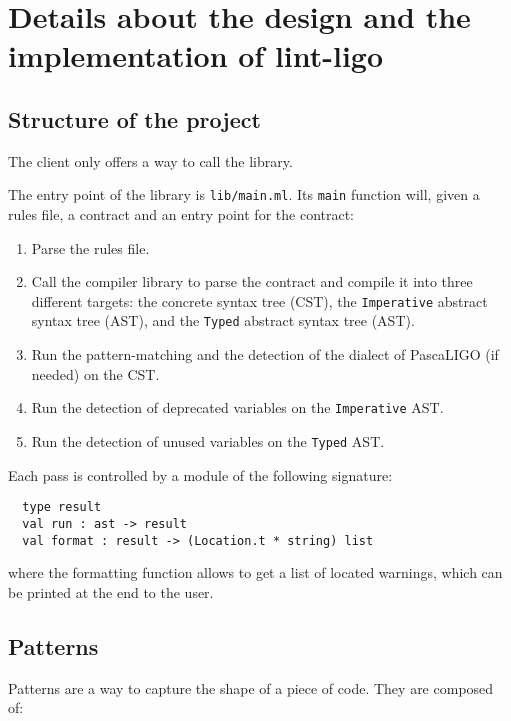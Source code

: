 \documentclass[10pt,a4paper]{article}
\begin{document}

\section{Details about the design and the implementation of lint-ligo}

\subsection{Structure of the project}

The client only offers a way to call the library.

The entry point of the library is \verb|lib/main.ml|. Its \verb|main|
function will, given a rules file, a contract and an entry point for
the contract:

\begin{enumerate}
\item
  Parse the rules file.

\item
  Call the compiler library to parse the contract and compile it into
  three different targets:
  the concrete syntax tree (CST),
  the \verb|Imperative| abstract syntax tree (AST),
  and the \verb|Typed| abstract syntax tree (AST).

\item
  Run the pattern-matching and the detection of the dialect of
  PascaLIGO (if needed) on the CST.

\item
  Run the detection of deprecated variables on the
  \verb|Imperative| AST.

\item
  Run the detection of unused variables on the \verb|Typed| AST.
\end{enumerate}

Each pass is controlled by a module of the following signature:
\begin{verbatim}
  type result
  val run : ast -> result
  val format : result -> (Location.t * string) list
\end{verbatim}

where the formatting function allows to get a list of located
warnings, which can be printed at the end to the user.

\subsection{Patterns}
Patterns are a way to capture the shape of a piece of code. They are
composed of:
\end{document}
